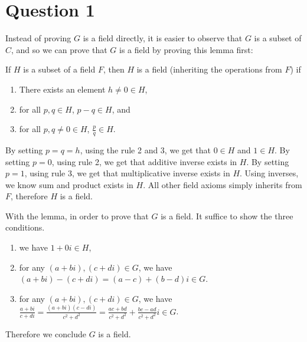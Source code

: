 \section*{Question 1}
Instead of proving $ G $ is a field directly, it is easier to observe that $ G $ is a subset of $ C $, and so we can prove that $ G $ is a field by proving this lemma first:

If $ H $ is a subset of a field $ F $, then $ H $ is a field (inheriting the operations from $ F $) if 
\begin{enumerate}
    \item There exists an element $ h \ne 0 \in H $, 
    \item for all $ p, q \in H $, $ p - q \in H $, and
    \item for all $ p, q \ne 0 \in H $, $ \frac{p}{q} \in H $.
\end{enumerate}

By setting $ p = q = h $, using the rule 2 and 3, we get that $ 0 \in H $ and $ 1 \in H $. By setting $ p = 0 $, using rule 2, we get that additive inverse exists in $ H $. By setting $ p = 1 $, using rule 3, we get that multiplicative inverse exists in $ H $. Using inverses, we know sum and product exists in $ H $. All other field axioms simply inherits from $ F $, therefore $ H $ is a field.

With the lemma, in order to prove that $ G $ is a field. It suffice to show the three conditions. 

\begin{enumerate}
    \item we have  $ 1 + 0i \in H $, 
    \item for any $ (a + bi), (c + di) \in G $, we have $ (a + bi) - (c + di) = (a-c) + (b-d)i \in G $. 
    \item for any $ (a + bi), (c + di) \in G $, we have $ \frac{a + bi}{c + di} = \frac{(a+bi)(c-di)}{c^2 + d^2} = \frac{ac+bd}{c^2+d^2} + \frac{bc-ad}{c^2+d^2}i \in G $.
\end{enumerate}

Therefore we conclude $ G $ is a field.